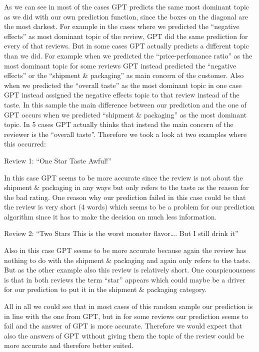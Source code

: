 \documentclass[
]{article}
\begin{document}
As we can see in most of the cases GPT predicts the same most dominant
topic as we did with our own prediction function, since the boxes on the
diagonal are the most darkest. For example in the cases where we
predicted the ``negative effects'' as most dominant topic of the review,
GPT did the same prediction for every of that reviews. But in some cases
GPT actually predicts a different topic than we did. For example when we
predicted the ``price-perfomance ratio'' as the most dominant topic for
some reviews GPT instead predicted the ``negative effects'' or the
``shipment \& packaging'' as main concern of the customer. Also when we
predicted the ``overall taste'' as the most dominant topic in one case
GPT instead assigned the negative effects topic to that review instead
of the taste. In this sample the main difference between our prediction
and the one of GPT occurs when we predicted ``shipment \& packaging'' as
the most dominant topic. In 5 cases GPT actually thinks that instead the
main concern of the reviewer is the ``overall taste''. Therefore we took
a look at two examples where this occurred:

Review 1: ``One Star Taste Awful!''

In this case GPT seems to be more accurate since the review is not about
the shipment \& packaging in any ways but only refers to the taste as
the reason for the bad rating. One reason why our prediction failed in
this case could be that the review is very short (4 words) which seems
to be a problem for our prediction algorithm since it has to make the
decision on much less information.

Review 2: ``Two Stars This is the worst monster flavor\ldots. But I
still drink it''

Also in this case GPT seems to be more accurate because again the review
has nothing to do with the shipment \& packaging and again only refers
to the taste. But as the other example also this review is relatively
short. One conspicuousness is that in both reviews the term ``star''
appears which could maybe be a driver for our prediction to put it in
the shipment \& packaging category.

All in all we could see that in most cases of this random sample our
prediction is in line with the one from GPT, but in for some reviews our
prediction seems to fail and the answer of GPT is more accurate.
Therefore we would expect that also the answers of GPT without giving
them the topic of the review could be more accurate and therefore better
suited.
\end{document}
